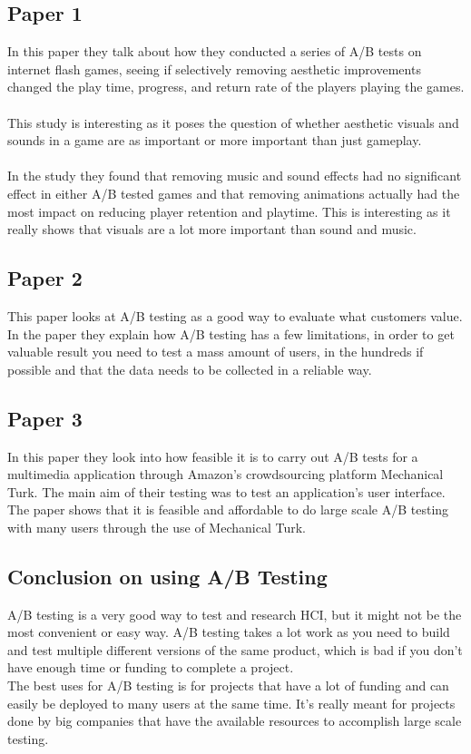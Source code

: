 \documentclass{scrartcl}
\begin{document}
\subsection{Paper 1 \cite{four}}
In this paper they talk about how they conducted a series of A/B tests on internet flash games, seeing if selectively removing aesthetic improvements changed the play time, progress, and return rate of the players playing the games.
\\
\\
This study is interesting as it poses the question of whether aesthetic visuals and sounds in a game are as important or more important than just gameplay.
\\
\\
In the study they found that removing music
and sound effects had no significant effect in either A/B tested games and that removing animations actually had the most impact on reducing player retention and playtime.
This is interesting as it really shows that visuals are a lot more important than sound and music. 

\subsection{Paper 2 \cite{five}}
This paper looks at A/B testing as a good way to evaluate what customers value.
In the paper they explain how A/B testing has a few limitations, in order to get valuable result you need to test a mass amount of users, in the hundreds if possible and that the data needs to be collected in a reliable way.


\subsection{Paper 3 \cite{six}}
In this paper they look into how feasible it is to carry out A/B tests for a multimedia application
through Amazon’s crowdsourcing platform Mechanical Turk.
The main aim of their testing was to test an application's user interface.
The paper shows that it is feasible and affordable to do large scale A/B testing with many users through the use of Mechanical Turk.

\subsection{Conclusion on using A/B Testing}
A/B testing is a very good way to test and research HCI, but it might not be the most convenient or easy way. A/B testing takes a lot work as you need to build and test multiple different versions of the same product, which is bad if you don't have enough time or funding to complete a project.
\\
The best uses for A/B testing is for projects that have a lot of funding and can easily be deployed to many users at the same time. It's really meant for projects done by big companies that have the available resources to accomplish large scale testing.
\end{document}
